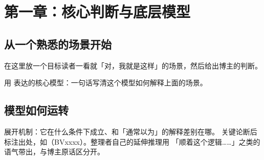 \section{第一章：核心判断与底层模型}


\subsection{从一个熟悉的场景开始}

在这里放一个目标读者一看就「对，我就是这样」的场景，然后给出博主的判断。

\begin{insight}
用  表达的核心模型：一句话写清这个模型如何解释上面的场景。
\end{insight}

\subsection{模型如何运转}

展开机制：它在什么条件下成立、和「通常以为」的解释差别在哪。
关键论断后标注出处，如（BVxxxx）。整理者自己的延伸推理用
「顺着这个逻辑……」之类的语气带出，与博主原话区分开。


